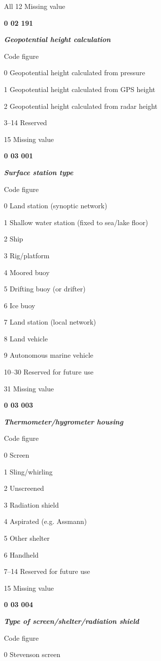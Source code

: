 All 12 Missing value

\textbf{0 02 191}

\emph{\textbf{Geopotential height calculation}}

Code figure

0 Geopotential height calculated from pressure

1 Geopotential height calculated from GPS height

2 Geopotential height calculated from radar height

3--14 Reserved

15 Missing value

\textbf{0 03 001}

\emph{\textbf{Surface station type}}

Code figure

0 Land station (synoptic network)

1 Shallow water station (fixed to sea/lake floor)

2 Ship

3 Rig/platform

4 Moored buoy

5 Drifting buoy (or drifter)

6 Ice buoy

7 Land station (local network)

8 Land vehicle

9 Autonomous marine vehicle

10--30 Reserved for future use

31 Missing value

\textbf{0 03 003}

\emph{\textbf{Thermometer/hygrometer housing}}

Code figure

0 Screen

1 Sling/whirling

2 Unscreened

3 Radiation shield

4 Aspirated (e.g. Assmann)

5 Other shelter

6 Handheld

7--14 Reserved for future use

15 Missing value

\textbf{0 03 004}

\emph{\textbf{Type of screen/shelter/radiation shield}}

Code figure

0 Stevenson screen

